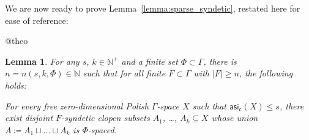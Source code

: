 \documentclass[11pt,reqno,psamsfonts]{amsart}
\makeatletter
\theoremstyle{bfnote}
\newtheorem{lemma}[theo]{Lemma}
\theoremstyle{definition}
\theoremstyle{remark}
\newcommand{\neutralize}[1]{\expandafter\let\csname c@#1\endcsname\count@}
\newenvironment{lemmacopy}[1]
{\renewcommand{\thetheo}{\ref{#1}}%
	\neutralize{theo}\phantomsection
	\begin{lemma}}
	{\end{lemma}}
\newcommand{\0}{\varnothing}
\renewcommand{\leq}{\leqslant}
\renewcommand{\geq}{\geqslant}
\newcommand{\defeq}{\coloneqq}
\newcommand{\bemph}[1]{{\normalfont#1}}
\newcommand{\ep}[1]{\bemph{(}#1\bemph{)}}
\newcommand{\G}{\Gamma}
\newcommand{\N}{\mathbb{N}}
\newcommand{\asi}{\mathsf{asi}}
\newcommand{\casi}{\asi_{\mathsf{c}}}
\numberwithin{equation}{section}
\makeatother
\begin{document}
    We are now ready to prove Lemma~\ref{lemma:sparse_syndetic}, restated here for ease of reference:

    \begin{lemmacopy}{lemma:sparse_syndetic}
        For any $s$, $k \in \N^+$ and a finite set $\Phi \subset \G$, there is $n = n(s,k, \Phi) \in \N$ such that for all finite $F \subset \G$ with $|F| \geq n$, the following holds:

        \smallskip
        
        \noindent For every free zero-dimensional Polish $\G$-space $X$ such that $\casi(X) \leq s$, there exist disjoint $F$-syndetic clopen subsets $A_1$, \ldots, $A_k \subseteq X$ whose union %
          $A \defeq A_1 \sqcup \ldots \sqcup A_k$ is $\Phi$-spaced.
    \end{lemmacopy}
\end{document}
